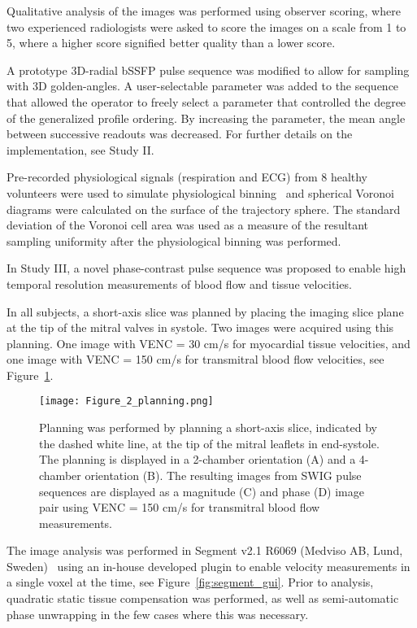 Qualitative analysis of the images was performed using observer scoring, where two experienced radiologists were asked to score the images on a scale from 1 to 5, where a higher score signified better quality than a lower score.


A prototype 3D-radial bSSFP pulse sequence was modified to allow for sampling with 3D golden-angles. A user-selectable parameter was added to the sequence that allowed the operator to freely select a parameter that controlled the degree of the generalized profile ordering. By increasing the parameter, the mean angle between successive readouts was decreased. For further details on the implementation, see Study II.

Pre-recorded physiological signals (respiration and ECG) from 8 healthy volunteers were used to simulate physiological binning~\cite{Holst2017} and spherical Voronoi diagrams were calculated on the surface of the trajectory sphere. The standard deviation of the Voronoi cell area was used as a measure of the resultant sampling uniformity after the physiological binning was performed.

In Study III, a novel phase-contrast pulse sequence was proposed to enable high temporal resolution measurements of blood flow and tissue velocities.

In all subjects, a short-axis slice was planned by placing the imaging slice plane at the tip of the mitral valves in systole. Two images were acquired using this planning. One image with VENC = 30 cm/s for myocardial tissue velocities, and one image with VENC = 150 cm/s for transmitral blood flow velocities, see Figure~\ref{fig:swig_planning}.

\begin{figure}[htbp]
    \centering
    \texttt{[image: Figure\_2\_planning.png]}
    \caption{Planning was performed by planning a short-axis slice, indicated by the dashed white line, at the tip of the mitral leaflets in end-systole. The planning is displayed in a 2-chamber orientation (A) and a 4-chamber orientation (B). The resulting images from SWIG pulse sequences are displayed as a magnitude (C) and phase (D) image pair using VENC = 150 cm/s for transmitral blood flow measurements.}
    \label{fig:swig_planning}
\end{figure}

The image analysis was performed in Segment v2.1 R6069 (Medviso AB, Lund, Sweden)~\cite{Heiberg2010} using an in-house developed plugin to enable velocity measurements in a single voxel at the time, see Figure~\ref{fig:segment_gui}. Prior to analysis, quadratic static tissue compensation was performed, as well as semi-automatic phase unwrapping in the few cases where this was necessary.

